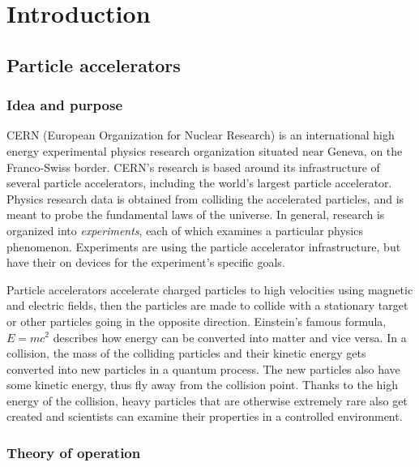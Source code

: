 \documentclass[12pt]{article}
\begin{document}
\newpage
\section{Introduction}\label{sec_intro}

\subsection{Particle accelerators}\label{sec_part_accel_intro}

\subsubsection{Idea and purpose}\label{sec_part_accel_idea}

CERN (European Organization for Nuclear Research) is an international high energy experimental physics research organization situated near Geneva, on the Franco-Swiss border. CERN's research is based around its infrastructure of several particle accelerators, including the world's largest particle accelerator. Physics research data is obtained from colliding the accelerated particles, and is meant to probe the fundamental laws of the universe. In general, research is organized into \textit{experiments}, each of which examines a particular physics phenomenon. Experiments are using the particle accelerator infrastructure, but have their on devices for the experiment's specific goals.
\cite{cern_about}

\vspace{1pc}\noindent
Particle accelerators accelerate charged particles to high velocities using magnetic and electric fields, then the particles are made to collide with a stationary target or other particles going in the opposite direction. Einstein's famous formula, $E=mc^2$ describes how energy can be converted into matter and vice versa. In a collision, the mass of the colliding particles and their kinetic energy gets converted into new particles in a quantum process. The new particles also have some kinetic energy, thus fly away from the collision point. Thanks to the high energy of the collision, heavy particles that are otherwise extremely rare also get created and scientists can examine their properties in a controlled environment.

\subsubsection{Theory of operation}\label{sec_part_accel_theory}
\end{document}
